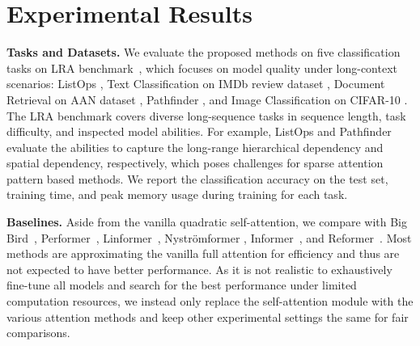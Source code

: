 \section{Experimental Results}
\label{sec:exp}







\textbf{Tasks and Datasets.}
We evaluate the proposed methods on five classification tasks on LRA benchmark~\citep{DBLP:journals/corr/abs-2011-04006}, which focuses on model quality under long-context scenarios: ListOps \citep{DBLP:conf/naacl/NangiaB18}, Text Classification on IMDb review dataset \citep{DBLP:conf/acl/MaasDPHNP11}, Document Retrieval on AAN dataset \citep{DBLP:journals/lre/RadevMQA13}, Pathfinder \citep{DBLP:conf/nips/LinsleyKVWS18}, and Image Classification on CIFAR-10 \citep{krizhevsky2009learning}.
The LRA benchmark covers diverse long-sequence tasks in sequence length, task difficulty, and inspected model abilities. 
For example, ListOps and Pathfinder evaluate the abilities to capture the long-range hierarchical dependency and spatial dependency, respectively, which poses challenges for sparse attention pattern based methods.
We report the classification accuracy on the test set, training time, and peak memory usage during training for each task.


\textbf{Baselines.}
Aside from the vanilla quadratic self-attention, we compare with Big Bird~\citep{DBLP:conf/nips/ZaheerGDAAOPRWY20}, Performer~\citep{DBLP:journals/corr/abs-2009-14794}, Linformer~\citep{DBLP:journals/corr/abs-2006-04768}, Nystr\"omformer \citep{DBLP:journals/corr/abs-2102-03902}, Informer~\citep{DBLP:journals/corr/abs-2012-07436},
and Reformer~\citep{DBLP:conf/iclr/KitaevKL20}.
Most methods are approximating the vanilla full attention for efficiency and thus are not expected to have better performance.
As it is not realistic to exhaustively fine-tune all models and search for the best performance under limited computation resources, we instead only replace the self-attention module with the various attention methods and keep other experimental settings the same for fair comparisons. 





